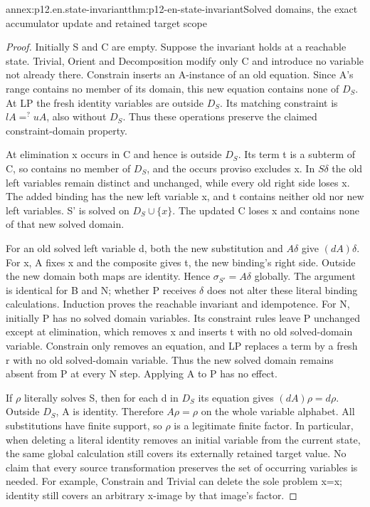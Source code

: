 \begin{annexitem}{annex:p12.en.state-invariant}{thm:p12-en-state-invariant}{Solved domains, the exact accumulator update and retained target scope}
\begin{proof}
Initially S and C are empty. Suppose the invariant holds at a
reachable state. Trivial, Orient and Decomposition modify only C
and introduce no variable not already there. Constrain inserts an
A-instance of an old equation. Since A's range contains no member
of its domain, this new equation contains none of \(D_S\).
At LP the fresh identity variables are outside \(D_S\). Its
matching constraint is \(l A=^{?}u A\), also without \(D_S\).
Thus these operations preserve the claimed constraint-domain property.

At elimination x occurs in C and hence is outside \(D_S\).
Its term t is a subterm of C, so contains no member of \(D_S\),
and the occurs proviso excludes x. In \(S\delta\) the old
left variables remain distinct and unchanged, while every old
right side loses x. The added binding has the new left variable x,
and t contains neither old nor new left variables. S' is solved
on \(D_S\cup\{x\}\). The updated C loses x and contains none
of that new solved domain.

For an old solved left variable d, both the new substitution and
\(A\delta\) give \((d A)\delta\). For x, A fixes x and the
composite gives t, the new binding's right side. Outside the new
domain both maps are identity. Hence \(\sigma_{S'}=A\delta\)
globally. The argument is identical for B and N; whether P receives
\(\delta\) does not alter these literal binding calculations.
Induction proves the reachable invariant and idempotence.
For N, initially P has no solved domain variables. Its constraint
rules leave P unchanged except at elimination, which removes x
and inserts t with no old solved-domain variable. Constrain only
removes an equation, and LP replaces a term by a fresh r with no
old solved-domain variable. Thus the new solved domain remains
absent from P at every N step. Applying A to P has no effect.

If \(\rho\) literally solves S, then for each d in \(D_S\)
its equation gives \((d A)\rho=d\rho\). Outside \(D_S\),
A is identity. Therefore \(A\rho=\rho\) on the whole variable
alphabet. All substitutions have finite support, so \(\rho\)
is a legitimate finite factor. In particular, when deleting a
literal identity removes an initial variable from the current
state, the same global calculation still covers its externally
retained target value. No claim that every source transformation
preserves the set of occurring variables is needed. For example,
Constrain and Trivial can delete the sole problem x=x; identity
still covers an arbitrary x-image by that image's factor.
\end{proof}
\end{annexitem}

